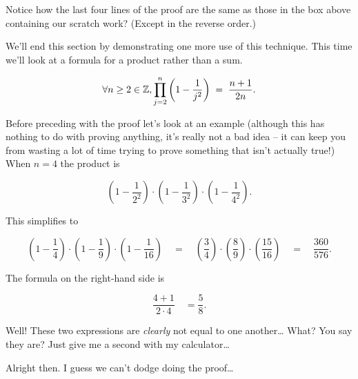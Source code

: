 Notice how the last four lines of the proof are the same as those in
the box above containing our scratch work?  (Except in the reverse order.)

We'll end this section by demonstrating one more use of this technique.
This time we'll look at a formula for a product rather than a sum.

\begin{thm} $$\forall n \geq 2 \in {\mathbb Z}, \prod_{j=2}^n \left( 1 - \frac{1}{j^2} \right) \;  = \; \frac{n+1}{2n}.$$
\end{thm}

Before preceding with the proof let's look at an example (although this 
has nothing to do with proving anything, it's really not a bad idea -- it can
keep you from wasting a lot of time trying to prove something that isn't 
actually true!)  When $n = 4$ the product is

\[  \left(1-\frac{1}{2^2}\right) \cdot \left(1-\frac{1}{3^2}\right) \cdot \left(1-\frac{1}{4^2}\right). 
\]

This simplifies to

\[ \left( 1-\frac{1}{4} \right) \cdot \left( 1-\frac{1}{9} \right) \cdot 
\left( 1-\frac{1}{16} \right) \quad = \quad \left( \frac{3}{4} \right) \cdot \left( \frac{8}{9} \right) \cdot \left( \frac{15}{16} \right) \quad = \quad \frac{360}{576}.
\]

The formula on the right-hand side is 

\[ \frac{4+1}{2 \cdot 4} \quad = \frac{5}{8}. \]

Well!  These two expressions are \emph{clearly} not equal to one another\ldots
What?  You say they are?  Just give me a second with my calculator\ldots

Alright then.  I guess we can't dodge doing the proof\ldots

